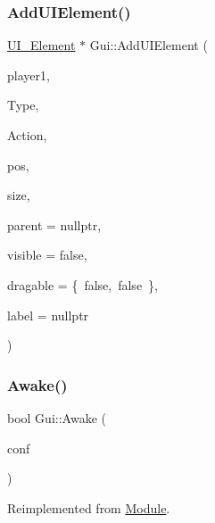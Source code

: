 \subsubsection{\texorpdfstring{AddUIElement()}{AddUIElement()}}
{\footnotesize\ttfamily \mbox{\hyperlink{class_u_i___element}{U\+I\+\_\+\+Element}} $\ast$ Gui\+::\+Add\+U\+I\+Element (\begin{DoxyParamCaption}\item[{bool}]{player1,  }\item[{\mbox{\hyperlink{class_u_i___element_a7ed595c46c75d53d30fa3813b036cf1e}{U\+I\+\_\+\+Element\+::\+U\+I\+\_\+type}}}]{Type,  }\item[{\mbox{\hyperlink{class_u_i___element_ae179047d98a379f4e0dcdf0871c7b8d6}{U\+I\+\_\+\+Element\+::\+Action}}}]{Action,  }\item[{pair$<$ int, int $>$}]{pos,  }\item[{pair$<$ int, int $>$}]{size,  }\item[{\mbox{\hyperlink{class_u_i___element}{U\+I\+\_\+\+Element}} $\ast$}]{parent = {\ttfamily nullptr},  }\item[{bool}]{visible = {\ttfamily false},  }\item[{\mbox{\hyperlink{struct_dragable}{Dragable}}}]{dragable = {\ttfamily \{~false,~false~\}},  }\item[{const char $\ast$}]{label = {\ttfamily nullptr} }\end{DoxyParamCaption})}

\mbox{\label{class_gui_adcbbb73f8357c13664a1638857683e00}} 
\subsubsection{\texorpdfstring{Awake()}{Awake()}}
{\footnotesize\ttfamily bool Gui\+::\+Awake (\begin{DoxyParamCaption}\item[{pugi\+::xml\+\_\+node \&}]{conf }\end{DoxyParamCaption})\hspace{0.3cm}{\ttfamily [virtual]}}



Reimplemented from \mbox{\hyperlink{class_module_a4a283650cf8a73aa0b5599106bc2ba6c}{Module}}.

\mbox{\label{class_gui_a77030d749cc47c605b43e2212596c90f}} 
